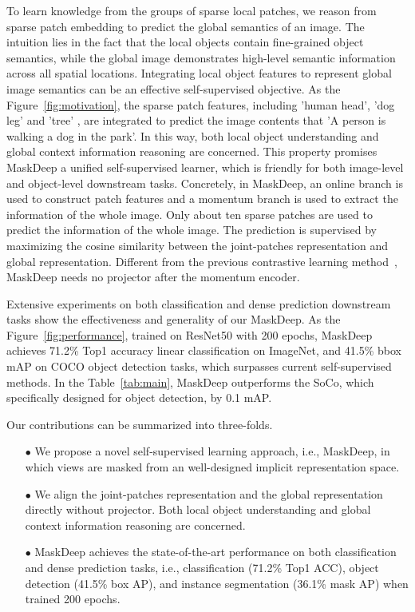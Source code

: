 \documentclass[10pt,twocolumn,letterpaper]{article}
\begin{document}
To learn knowledge from the groups of sparse local patches, we reason from sparse patch embedding to predict the global semantics of an image. The intuition lies in the fact that the local objects contain fine-grained object semantics, while the global image demonstrates high-level semantic information across all spatial locations. Integrating local object features to represent global image semantics can be an effective self-supervised objective. As the Figure~\ref{fig:motivation}, the sparse patch features, including 'human head', 'dog leg' and 'tree' \etc, are integrated to predict the image contents that 'A person is walking a dog in the park'.
In this way, both local object understanding and global context information reasoning are concerned. This property promises MaskDeep a unified self-supervised learner, which is friendly for both image-level and object-level downstream tasks. Concretely, in MaskDeep, an online branch is used to construct patch features and a momentum branch is used to extract the information of the whole image. Only about ten sparse patches are used to predict the information of the whole image. The prediction is supervised by maximizing the cosine similarity between the joint-patches representation and global representation. Different from the previous contrastive learning method~\cite{grill2020bootstrap}, MaskDeep needs no projector after the momentum encoder.

Extensive experiments on both classification and dense prediction downstream tasks show the effectiveness and generality of our MaskDeep. As the Figure~\ref{fig:performance}, trained on ResNet50 with 200 epochs, MaskDeep achieves 71.2\% Top1 accuracy linear classification on ImageNet, and 41.5\% bbox mAP on COCO object detection tasks, which surpasses current self-supervised methods. In the Table~\ref{tab:main}, MaskDeep outperforms the SoCo, which specifically designed for object detection, by 0.1 mAP. 

Our contributions can be summarized into three-folds. 
\begin{itemize}
    \item[$\bullet$] We propose a novel self-supervised learning approach, i.e., MaskDeep, in which views are masked from an well-designed implicit representation space.
    \item[$\bullet$] We align the joint-patches representation and the global representation directly without projector. Both local object understanding and global context information reasoning are concerned.
    \item[$\bullet$] MaskDeep achieves the state-of-the-art performance on both classification and dense prediction tasks, i.e., classification (71.2\% Top1 ACC), object detection (41.5\% box AP), and instance segmentation (36.1\% mask AP) when trained 200 epochs.
\end{itemize} 
\end{document}
